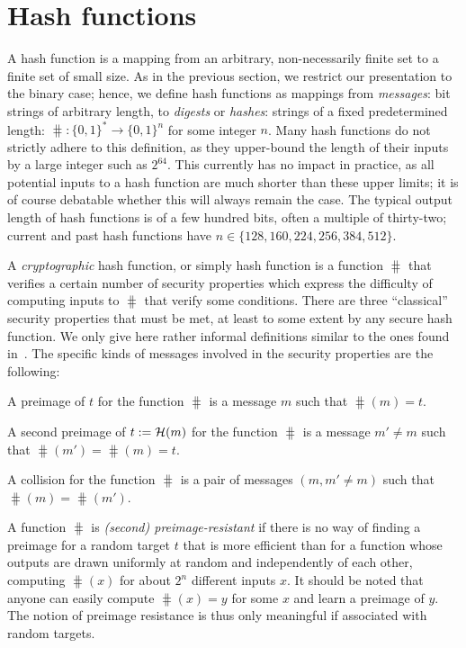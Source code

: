 \section{Hash functions}
\label{sec:intro}

A hash function is a mapping from an arbitrary, non-necessarily finite set to a finite set of small size. As in the previous section, we
restrict our presentation to the binary case; hence, we define hash functions as
mappings from \emph{messages}: bit strings of arbitrary length, to \emph{digests} or \emph{hashes}: strings of a fixed predetermined length:
$\hash : \{0,1\}^* \rightarrow \{0,1\}^n$ for some integer $n$.
Many hash functions do not strictly adhere to this definition, as they upper-bound the length of their inputs by a large integer such as $2^{64}$. This currently has
no impact in practice, as all potential inputs to a hash function are much shorter than these upper limits; it is of course debatable whether this will always remain the case.
The typical output length of hash functions is of a few hundred bits, often a multiple of thirty-two; current and past hash functions have
$n \in \{128, 160, 224, 256, 384, 512\}$.

A \emph{cryptographic} hash function, or simply hash function is a function $\hash$ that verifies a certain number of security properties
which express the difficulty of computing inputs
to $\hash$ that verify some conditions. There are three ``classical'' security properties that must be met, at least to some extent
by any secure hash function. We only give here rather informal definitions similar to the ones found \eg in~\cite[Chapter 9]{HAC96}.
The specific kinds of messages involved in the security properties are the following:

\begin{defi}[Preimage]
A preimage of $t$ for the function $\hash$ is a message $m$ such that $\hash(m) = t$.
\label{def:pre}
\end{defi}
\begin{defi}
A second preimage of $t := \operatorname{\mathcal{H}}(m)$ for the function $\hash$ is a message $m' \neq m$ such that
$\hash(m') = \hash(m) = t$.
\label{def:2pre}
\end{defi}
\begin{defi}[Collision]
A collision for the function $\hash$ is a pair of messages $(m,m'\neq m)$ such that $\hash(m) = \hash(m')$.
\label{def:coll}
\end{defi}

A function $\hash$ is \emph{(second) preimage-resistant} if there is no way of finding a preimage for a
random target $t$ that is more efficient than for a function whose outputs are drawn uniformly at random
and independently of each other, \ie computing $\hash(x)$ for about $2^n$ different inputs $x$.
It should be noted that anyone can easily compute $\hash(x) = y$ for some $x$ and learn a preimage of $y$.
The notion of preimage resistance is thus only meaningful if associated with random targets.

